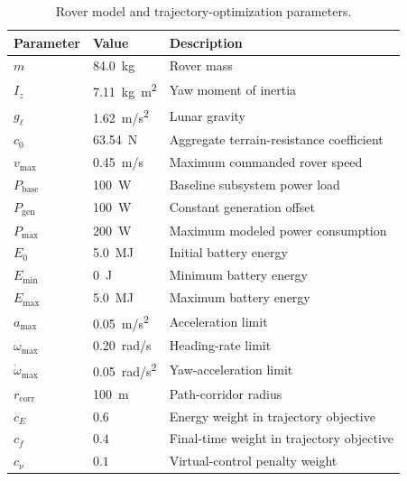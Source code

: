 \documentclass[conf]{new-aiaa}
\begin{document}
\begin{table}[h]
\centering
\caption{Rover model and trajectory-optimization parameters.}
\label{tab:rover_params}
\begin{tabular}{lll}
\toprule
Parameter & Value & Description \\
\midrule
$m$ & \SI{84.0}{kg} & Rover mass \\
$I_z$ & \SI{7.11}{kg.m^2} & Yaw moment of inertia \\
$g_\ell$ & \SI{1.62}{m/s^2} & Lunar gravity \\
$c_0$ & \SI{63.54}{N} & Aggregate terrain-resistance coefficient \\
$v_{\max}$ & \SI{0.45}{m/s} & Maximum commanded rover speed \\
$P_{\mathrm{base}}$ & \SI{100}{W} & Baseline subsystem power load \\
$P_{\mathrm{gen}}$ & \SI{100}{W} & Constant generation offset \\
$P_{\max}$ & \SI{200}{W} & Maximum modeled power consumption \\
$E_0$ & \SI{5.0}{MJ} & Initial battery energy \\
$E_{\min}$ & \SI{0}{J} & Minimum battery energy \\
$E_{\max}$ & \SI{5.0}{MJ} & Maximum battery energy \\
$a_{\max}$ & \SI{0.05}{m/s^2} & Acceleration limit \\
$\omega_{\max}$ & \SI{0.20}{rad/s} & Heading-rate limit \\
$\dot{\omega}_{\max}$ & \SI{0.05}{rad/s^2} & Yaw-acceleration limit \\
$r_{\mathrm{corr}}$ & \SI{100}{m} & Path-corridor radius \\
$c_E$ & $0.6$ & Energy weight in trajectory objective \\
$c_f$ & $0.4$ & Final-time weight in trajectory objective \\
$c_\nu$ & $0.1$ & Virtual-control penalty weight \\
\bottomrule
\end{tabular}
\end{table}
\end{document}
